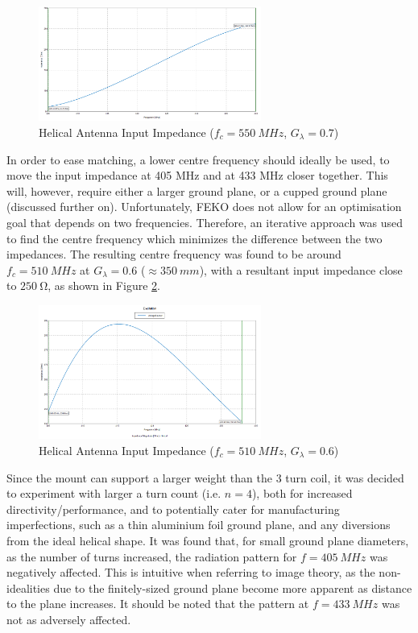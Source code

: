 \begin{figure}[!htb]
  \centering
  \includegraphics[width=0.65\textwidth]{helix3_impedance}
  \caption{Helical Antenna Input Impedance ($f_c = \SI{550}{MHz}$, $G_\lambda = 0.7$)}
  \label{fig:helix3_impedance}
\end{figure}

In order to ease matching, a lower centre frequency should ideally be used, to move the input impedance at 405 MHz and at 433 MHz closer together. This will, however, require either a larger ground plane, or a cupped ground plane (discussed further on). Unfortunately, FEKO does not allow for an optimisation goal that depends on two frequencies. Therefore, an iterative approach was used to find the centre frequency which minimizes the difference between the two impedances. The resulting centre frequency was found to be around $f_c = \SI{510}{MHz}$ at $G_\lambda = 0.6$ ($\approx \SI{350}{mm}$), with a resultant input impedance close to $\SI{250}{\ohm}$, as shown in Figure \ref{fig:helix4_impedance}.

\begin{figure}[!htb]
  \centering
  \includegraphics[width=0.65\textwidth]{helix4_impedance}
  \caption{Helical Antenna Input Impedance ($f_c = \SI{510}{MHz}$, $G_\lambda = 0.6$)}
  \label{fig:helix4_impedance}
\end{figure}

Since the mount can support a larger weight than the 3 turn coil, it was decided to experiment with larger a turn count (i.e. $n=4$), both for increased directivity/performance, and to potentially cater for manufacturing imperfections, such as a thin aluminium foil ground plane, and any diversions from the ideal helical shape. It was found that, for small ground plane diameters, as the number of turns increased, the radiation pattern for $f = \SI{405}{MHz}$ was negatively affected. This is intuitive when referring to image theory, as the non-idealities due to the finitely-sized ground plane become more apparent as distance to the plane increases. It should be noted that the pattern at $f = \SI{433}{MHz}$ was not as adversely affected.

